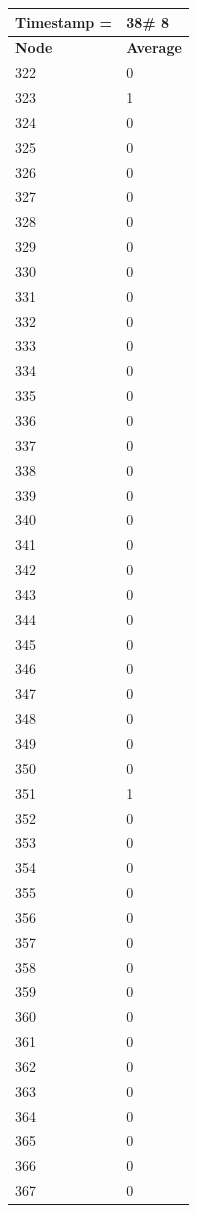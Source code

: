 \begin{tabular}{|l||l|}
\hline
\textbf{Timestamp =} & \textbf{38}\# 8\\\hline
	\textbf{Node} & \textbf{Average} \\ \hline
\hline
	322 & 0 \\ \hline
	323 & 1 \\ \hline
	324 & 0 \\ \hline
	325 & 0 \\ \hline
	326 & 0 \\ \hline
	327 & 0 \\ \hline
	328 & 0 \\ \hline
	329 & 0 \\ \hline
	330 & 0 \\ \hline
	331 & 0 \\ \hline
	332 & 0 \\ \hline
	333 & 0 \\ \hline
	334 & 0 \\ \hline
	335 & 0 \\ \hline
	336 & 0 \\ \hline
	337 & 0 \\ \hline
	338 & 0 \\ \hline
	339 & 0 \\ \hline
	340 & 0 \\ \hline
	341 & 0 \\ \hline
	342 & 0 \\ \hline
	343 & 0 \\ \hline
	344 & 0 \\ \hline
	345 & 0 \\ \hline
	346 & 0 \\ \hline
	347 & 0 \\ \hline
	348 & 0 \\ \hline
	349 & 0 \\ \hline
	350 & 0 \\ \hline
	351 & 1 \\ \hline
	352 & 0 \\ \hline
	353 & 0 \\ \hline
	354 & 0 \\ \hline
	355 & 0 \\ \hline
	356 & 0 \\ \hline
	357 & 0 \\ \hline
	358 & 0 \\ \hline
	359 & 0 \\ \hline
	360 & 0 \\ \hline
	361 & 0 \\ \hline
	362 & 0 \\ \hline
	363 & 0 \\ \hline
	364 & 0 \\ \hline
	365 & 0 \\ \hline
	366 & 0 \\ \hline
	367 & 0 \\ \hline
\end{tabular}
